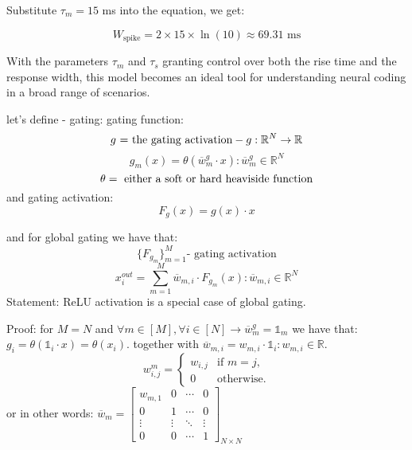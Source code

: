 Substitute $\tau_m = 15$ ms into the equation, we get:

\begin{equation}
W_{\text{{spike}}} = 2 \times 15 \times \ln(10) \approx 69.31 \text{ ms}
\end{equation}

With the parameters $\tau_m$ and $\tau_s$ granting control over both the rise time and the response width, this model becomes an ideal tool for understanding neural coding in a broad range of scenarios.



let's define - gating:
gating function:
\begin{equation} \notag
    \text{$g$ = the gating activation} - g: \mathbb{R}^N \rightarrow \mathbb{R}
\end{equation}
\begin{equation}
    g_m(x) = \theta(\overline{w}_m^g \cdot x) : \overline{w}_m^g \in \mathbb{R}^N
\end{equation}
\begin{equation} \notag
    \theta = \text{ either a soft or hard heaviside function}
\end{equation}
and gating activation:
\begin{equation}
    F_g(x) = g(x) \cdot x
\end{equation}

and for global gating we have that:
\begin{equation}
    \{F_{g_m}\}_{m=1}^M \text{- gating activation}
\end{equation}
\begin{equation}
    x_i^{out} = \sum_{m=1}^M \overline{w}_{m, i} \cdot F_{g_m}(x) : \overline{w}_{m, i} \in \mathbb{R}^N
\end{equation}
Statement: 
ReLU activation is a special case of global gating.

Proof:
for $M=N$ and $\forall m \in [M], \forall i \in [N] \rightarrow \overline{w}_m^g = \mathbb{1}_m$  we have that: $g_i = \theta(\mathbb{1}_i \cdot x) = \theta(x_i)$.
together with $\overline{w}_{m, i} = w_{m, i} \cdot \mathbb{1}_i : w_{m, i} \in \mathbb{R}$.
\begin{equation}
    w_{i, j}^m = 
    \begin{cases}
        w_{i, j} & \text{if } m = j, \\
        0 & \text{otherwise.}
    \end{cases}
\end{equation}
or in other words: $\overline{w}_{m} = \begin{bmatrix}
w_{m, 1} & 0 & \cdots & 0 \\
0 & 1 & \cdots & 0 \\
\vdots & \vdots & \ddots & \vdots \\
0 & 0 & \cdots & 1 
\end{bmatrix}
_{N \times N}$

